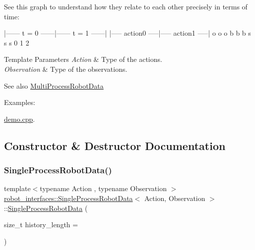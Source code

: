 See this graph to understand how they relate to each other precisely in terms of time\+:

\begin{DoxyVerb}|------ t = 0 ------|------ t = 1 ------|
|----- action0 -----|----- action1 -----|
o                   o                   o
b                   b                   b
s                   s                   s
0                   1                   2
\end{DoxyVerb}



\begin{DoxyTemplParams}{Template Parameters}
{\em Action} & Type of the actions. \\
\hline
{\em Observation} & Type of the observations. \\
\hline
\end{DoxyTemplParams}
\begin{DoxySeeAlso}{See also}
\hyperlink{classrobot__interfaces_1_1MultiProcessRobotData}{Multi\+Process\+Robot\+Data} 
\end{DoxySeeAlso}
\begin{Desc}
\item[Examples\+: ]\par
\hyperlink{demo_8cpp-example}{demo.\+cpp}.\end{Desc}


\subsection{Constructor \& Destructor Documentation}
\mbox{\label{classrobot__interfaces_1_1SingleProcessRobotData_adcb9896c90464e27fb1cd2f303ca7cef}} 
\subsubsection{\texorpdfstring{Single\+Process\+Robot\+Data()}{SingleProcessRobotData()}}
{\footnotesize\ttfamily template$<$typename Action , typename Observation $>$ \\
\hyperlink{classrobot__interfaces_1_1SingleProcessRobotData}{robot\+\_\+interfaces\+::\+Single\+Process\+Robot\+Data}$<$ Action, Observation $>$\+::\hyperlink{classrobot__interfaces_1_1SingleProcessRobotData}{Single\+Process\+Robot\+Data} (\begin{DoxyParamCaption}\item[{size\+\_\+t}]{history\+\_\+length = {} }\end{DoxyParamCaption})\hspace{0.3cm}{\ttfamily [inline]}}



